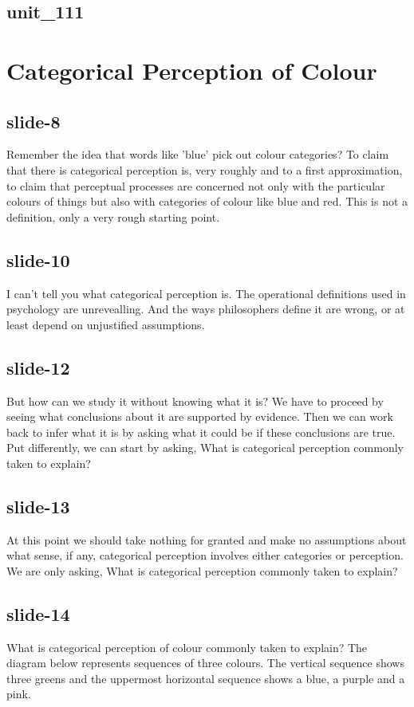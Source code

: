 \documentclass[12pt,\papersize]{extarticle}
\begin{document}
 
\subsection{unit\_111}
 
\section{Categorical Perception of Colour}
 
 
\subsection{slide-8}
Remember the idea that words like 'blue' pick out colour categories?
To claim that there is categorical perception is, very roughly and to a first approximation, to claim that perceptual processes are concerned not only with the particular colours of things but also with categories of colour like blue and red.
This is not a definition, only a very rough starting point.
 
 
\subsection{slide-10}
I can't tell you what categorical perception is.
The operational definitions used in psychology are unrevealling.
And the ways philosophers define it are wrong, or at least depend on unjustified assumptions.
 
 
\subsection{slide-12}
But how can we study it without knowing what it is?
We have to proceed by seeing what conclusions about it are supported by evidence.
Then we can work back to infer what it is by asking what it could be if these conclusions are true.
Put differently, we can start by asking, What is categorical perception commonly taken to explain?
 
 
\subsection{slide-13}
At this point we should take nothing for granted and make no assumptions about what sense, if any, categorical perception involves either categories or perception.
We are only asking, What is categorical perception commonly taken to explain?
 
 
\subsection{slide-14}
What is categorical perception of colour commonly taken to explain?
The diagram below represents sequences of three colours.
The vertical sequence shows three greens and the uppermost horizontal sequence shows a blue, a purple and a pink.
 
\end{document}
